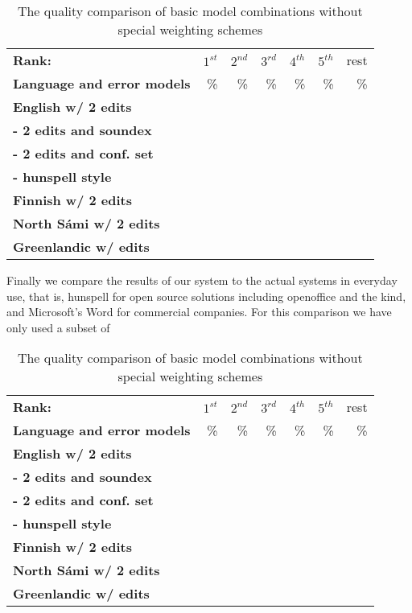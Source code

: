 \documentclass[a4paper,12pt]{article}
\begin{document}
\begin{table}
    \centering
    \begin{tabular}{|l|r|r|r|r|r|r|}
        \hline
        \bf Rank: & $1^{st}$ & $2^{nd}$ & $3^{rd}$ & $4^{th}$ & $5^{th}$ & rest \\
        \bf Language and error models &  \% & \% & \% & \% & \% & \% \\
        \hline
        \bf English w/ 2 edits & & & & & & \\
     \bf - 2 edits and soundex & & & & & & \\
   \bf - 2 edits and conf. set & & & & & & \\
          \bf - hunspell style & & & & & & \\
        \hline
        \bf Finnish w/ 2 edits & & & & & \\
        \hline
        \bf North Sámi w/ 2 edits & & & & & \\
        \hline
        \bf Greenlandic w/ edits & & & & & \\
        \hline
    \end{tabular}
    \caption{The quality comparison of basic model combinations without special
    weighting schemes\label{table:distance-quality}}
\end{table}

Finally we compare the results of our system to the actual systems in everyday
use, that is, hunspell for open source solutions including openoffice and the
kind, and Microsoft's Word for commercial companies. For this comparison we
have only used a subset of 

\begin{table}
    \centering
    \begin{tabular}{|l|r|r|r|r|r|r|}
        \hline
        \bf Rank: & $1^{st}$ & $2^{nd}$ & $3^{rd}$ & $4^{th}$ & $5^{th}$ & rest \\
        \bf Language and error models &  \% & \% & \% & \% & \% & \% \\
        \hline
        \bf English w/ 2 edits & & & & & & \\
     \bf - 2 edits and soundex & & & & & & \\
   \bf - 2 edits and conf. set & & & & & & \\
          \bf - hunspell style & & & & & & \\
        \hline
        \bf Finnish w/ 2 edits & & & & & \\
        \hline
        \bf North Sámi w/ 2 edits & & & & & \\
        \hline
        \bf Greenlandic w/ edits & & & & & \\
        \hline
    \end{tabular}
    \caption{The quality comparison of basic model combinations without special
    weighting schemes\label{table:commercial-quality}}
\end{table}
\end{document}
